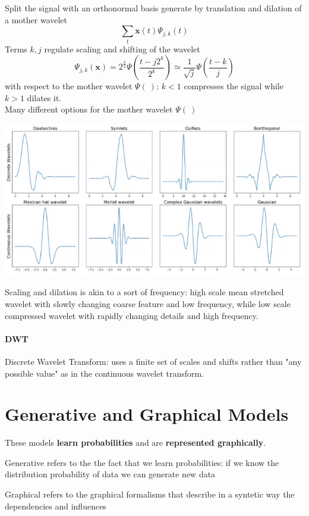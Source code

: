 \documentclass[10pt]{report}
\begin{document}
Split the signal with an orthonormal basis generate by translation and dilation of a mother wavelet $$\sum_t \mathbf{x}(t)\Psi_{j,k}(t)$$
Terms $k,j$ regulate scaling and shifting of the wavelet
$$\Psi_{j,k}(\mathbf{x}) = 2^{\frac{k}{2}}\Psi\left(\frac{t-j2^k}{2^k}\right) \simeq \frac{1}{\sqrt{j}}\Psi\left(\frac{t - k}{j}\right)$$
with respect to the mother wavelet $\Psi(\:)$: $k<1$ compresses the signal while $k>1$ dilates it.\\
Many different options for the mother wavelet $\Psi(\:)$
\begin{center}
	\includegraphics[scale=0.5]{13.png}
\end{center}
Scaling and dilation is akin to a sort of frequency: high scale mean stretched wavelet with slowly changing coarse feature and low frequency, while low scale compressed wavelet with rapidly changing details and high frequency.
\paragraph{DWT} Discrete Wavelet Transform: uses a finite set of scales and shifts rather than "any possible value" as in the continuous wavelet transform.

\section{Generative and Graphical Models}
These models \textbf{learn probabilities} and are \textbf{represented graphically}.
\begin{list}{}{}
	\item Generative refers to the the fact that we learn probabilities: if we know the distribution probability of data we can generate new data
	\item Graphical refers to the graphical formalisms that describe in a syntetic way the dependencies and influences
\end{list}
\end{document}
